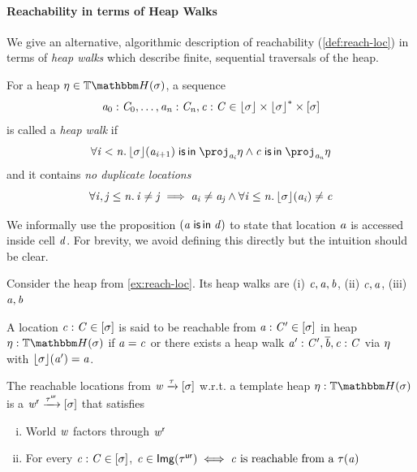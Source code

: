 \paragraph{Reachability in terms of Heap Walks}

We give an alternative, algorithmic description of reachability (\cref{def:reach-loc}) in terms of \emph{heap walks} which describe finite, sequential traversals of the heap.
\begin{definition}
    For a heap $\mvarM \in \theapF(\sigma)$, a sequence 
    \[ \mathit{a}_0 : \mathit{C}_0, \hdots, \mathit{a}_{\mathit{n}} : \mathit{C}_{\mathit{n}}, \mathit{c} : \mathit{C} \in \lfloor\sigma\rfloor \times {\lfloor\sigma\rfloor}^* \times [\sigma] \] 
    is called a \emph{heap walk} if
    \[ \All{\vi < \vn} \concL\sigma(\va_{\vi+1}) \isIn \proj_{\va_\vi} \mvarM  \Land \vc \isIn \proj_{\va_\vn} \mvarM \]
    and it contains \emph{no duplicate locations}
    \[ \forall \mathit{i}, \mathit{j} \le \mathit{n}.\, \mathit{i} \neq \mathit{j} \implies \mathit{a}_{\mathit{i}} \neq \mathit{a}_{\mathit{j}} \wedge \forall \mathit{i} \le \mathit{n}.\, \lfloor\sigma\rfloor(\mathit{a}_{\mathit{i}}) \neq \mathit{c} \]
\end{definition}
We informally use the proposition $(\mathit{a} \;\mathsf{is}\,\mathsf{in}\; \mathit{d})$ to state that location $\mathit{a}$ is accessed inside cell $\mathit{d}$.
For brevity, we avoid defining this directly but the intuition should be clear.
\begin{example}
    Consider the heap from \cref{ex:reach-loc}. Its heap walks are 
    (i) $\mathit{c}, \mathit{a}, \mathit{b}$, 
    (ii) $\mathit{c}, \mathit{a}$, 
    (iii) $\mathit{a}, \mathit{b}$
\end{example}

\begin{definition}
    A location $\mathit{c} : \mathit{C} \in [\sigma]$ is said to be reachable from $\mathit{a} : \mathit{C}' \in [\sigma]$ in heap $\mvarM : \theapF(\sigma)$ if 
    $\mathit{a} = \mathit{c}$ or there exists a heap walk $\mathit{a}' : \mathit{C}', \overline{\mathit{b}}, \mathit{c} : \mathit{C}$ via $\eta$ with $\lfloor\sigma\rfloor(\mathit{a}') = \mathit{a}$.
\end{definition}

\begin{definition}\label{def:reach-loc-hwalks}
    The reachable locations from $\mathit{w} \xrightarrow\tau [\sigma]$ w.r.t. a template heap $\mvarM : \theapF(\sigma)$
    is a $\mathit{w}^{\mathsf{r}} \xrightarrow{\tau^{\mathsf{ur}}} [\sigma]$ that satisfies
    \begin{enumerate}[(i)]
        \item World $\mathit{w}$ factors through $\mathit{w}^{\mathsf{r}}$
            \begin{center}
            \end{center}
        \item For every $\mathit{c} : \mathit{C} \in [\sigma]$, $\mathit{c} \in \mathsf{Img}(\tau^{\mathsf{ur}}) \iff \mathit{c} \text{ is reachable from a } \tau(\mathit{a})$
        \end{enumerate}
\end{definition}

